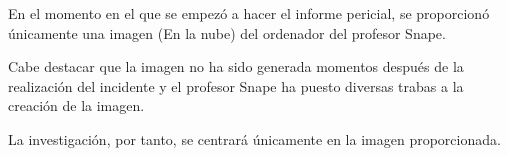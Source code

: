 En el momento en el que se empezó a hacer el informe pericial, se proporcionó únicamente una imagen (En la nube) del ordenador del profesor Snape.

Cabe destacar que la imagen no ha sido generada momentos después de la realización del incidente y el profesor Snape ha puesto diversas trabas a la creación de la imagen.

La investigación, por tanto, se centrará únicamente en la imagen proporcionada.
